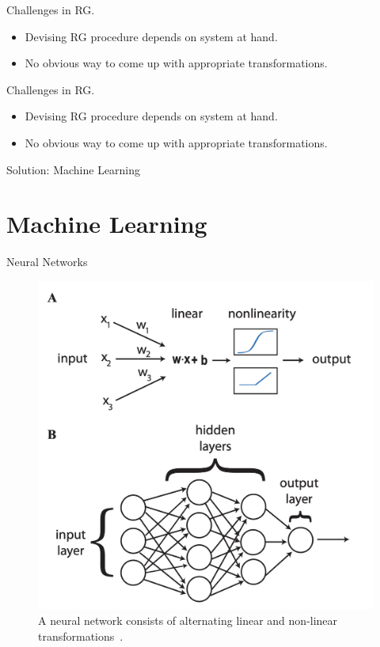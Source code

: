 \documentclass{beamer}
\begin{document}
\begin{frame}{Challenges in RG.}

  {\Large
  \begin{itemize}
  \item Devising RG procedure depends on system at hand.
  \item No obvious way to come up with appropriate transformations.
  \end{itemize}
  }
\end{frame}

\begin{frame}{Challenges in RG.}

  {\Large
  \begin{itemize}
  \item Devising RG procedure depends on system at hand.
  \item No obvious way to come up with appropriate transformations.
  \end{itemize}
  }

  {\Large Solution: Machine Learning}
\end{frame}

\section{Machine Learning}
\begin{frame}{Neural Networks}
  \begin{figure}[ht]
    \centering \includegraphics[width=0.7\linewidth]{figures/ffnn.png}
    \caption{A neural network consists of alternating linear and
      non-linear transformations~\cite{mehta-review}.}
  \end{figure}
\end{frame}
\end{document}
